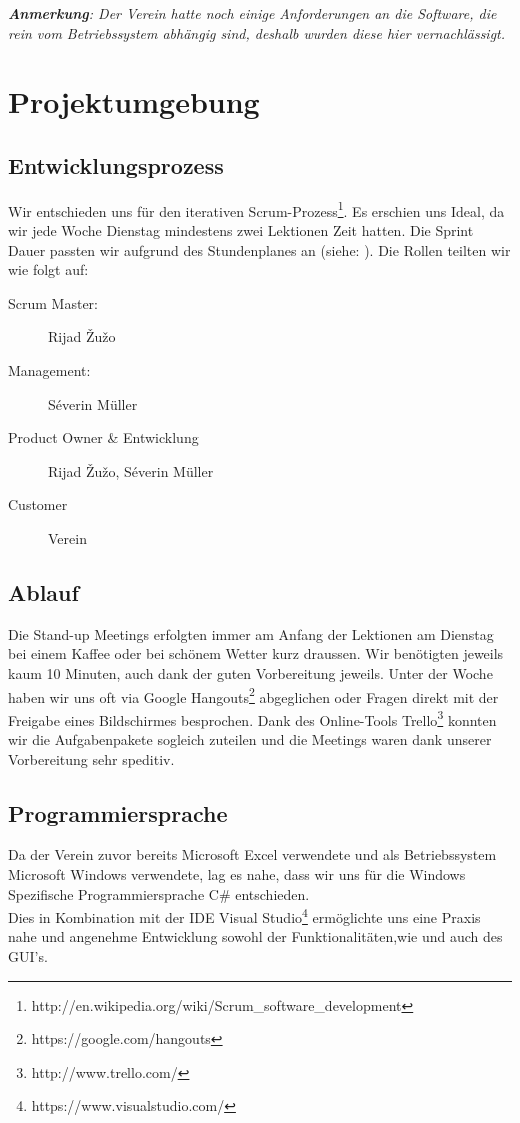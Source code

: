 \documentclass{article}
\begin{document}
\vspace{2cm}

\textit{\textbf{Anmerkung}: Der Verein hatte noch einige Anforderungen an die Software, die rein vom Betriebssystem abhängig sind, deshalb wurden diese hier vernachlässigt.}
	

\newpage


\section{Projektumgebung}
\vspace{5mm}
\subsection{Entwicklungsprozess	}
Wir entschieden uns für den iterativen Scrum-Prozess\footnote{http://en.wikipedia.org/wiki/Scrum\_software\_development}. Es erschien uns Ideal, da wir jede Woche Dienstag mindestens zwei Lektionen Zeit hatten. Die Sprint Dauer passten wir aufgrund des Stundenplanes an (siehe: ). Die Rollen teilten wir wie folgt auf:

\begin{description}
	\item[Scrum Master:] Rijad \v{Z}u\v{z}o
	\item[Management:] Séverin Müller
	\item[Product Owner \& Entwicklung] Rijad \v{Z}u\v{z}o, Séverin Müller
	\item[Customer] Verein
\end{description}

\subsection{Ablauf}
Die Stand-up Meetings erfolgten immer am Anfang der Lektionen am Dienstag bei einem Kaffee oder bei schönem Wetter kurz draussen. Wir benötigten jeweils kaum 10 Minuten, auch dank der guten Vorbereitung jeweils. Unter der Woche haben wir uns oft via Google Hangouts\footnote{https://google.com/hangouts} abgeglichen oder Fragen direkt mit der Freigabe eines Bildschirmes besprochen. 
Dank des Online-Tools Trello\footnote{http://www.trello.com/}  konnten wir die Aufgabenpakete sogleich zuteilen und die Meetings waren dank unserer Vorbereitung sehr speditiv. 

\subsection{Programmiersprache}
Da der Verein zuvor bereits Microsoft Excel verwendete und als Betriebssystem Microsoft Windows verwendete, lag es nahe, dass wir uns für die Windows Spezifische Programmiersprache C\# entschieden. \\ Dies in Kombination mit der IDE Visual Studio\footnote{https://www.visualstudio.com/} ermöglichte uns eine Praxis nahe und angenehme Entwicklung sowohl der Funktionalitäten,wie und auch des GUI's. 
\end{document}
